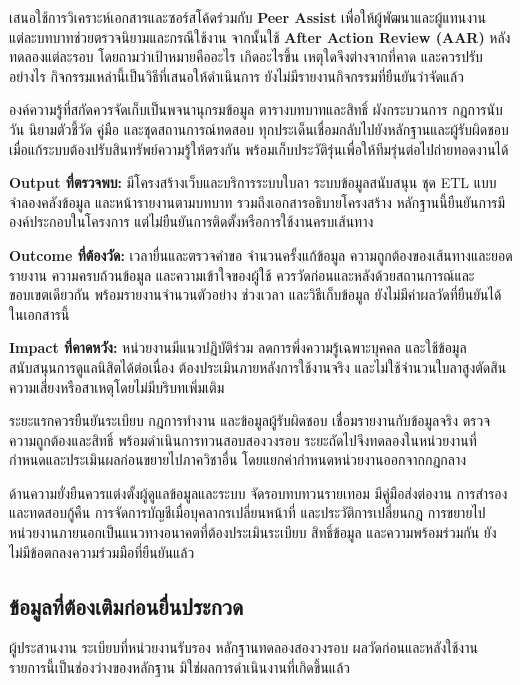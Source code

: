 เสนอใช้การวิเคราะห์เอกสารและซอร์สโค้ดร่วมกับ \textbf{Peer Assist} เพื่อให้ผู้พัฒนาและผู้แทนงานแต่ละบทบาทช่วยตรวจนิยามและกรณีใช้งาน จากนั้นใช้ \textbf{After Action Review (AAR)} หลังทดลองแต่ละรอบ โดยถามว่าเป้าหมายคืออะไร เกิดอะไรขึ้น เหตุใดจึงต่างจากที่คาด และควรปรับอย่างไร กิจกรรมเหล่านี้เป็นวิธีที่เสนอให้ดำเนินการ ยังไม่มีรายงานกิจกรรมที่ยืนยันว่าจัดแล้ว

องค์ความรู้ที่สกัดควรจัดเก็บเป็นพจนานุกรมข้อมูล ตารางบทบาทและสิทธิ์ ผังกระบวนการ กฎการนับวัน นิยามตัวชี้วัด คู่มือ และชุดสถานการณ์ทดสอบ ทุกประเด็นเชื่อมกลับไปยังหลักฐานและผู้รับผิดชอบ เมื่อแก้ระบบต้องปรับสินทรัพย์ความรู้ให้ตรงกัน พร้อมเก็บประวัติรุ่นเพื่อให้ทีมรุ่นต่อไปถ่ายทอดงานได้

\textbf{Output ที่ตรวจพบ:} มีโครงสร้างเว็บและบริการระบบใบลา ระบบข้อมูลสนับสนุน ชุด ETL แบบจำลองคลังข้อมูล และหน้ารายงานตามบทบาท รวมถึงเอกสารอธิบายโครงสร้าง หลักฐานนี้ยืนยันการมีองค์ประกอบในโครงการ แต่ไม่ยืนยันการติดตั้งหรือการใช้งานครบเส้นทาง

\textbf{Outcome ที่ต้องวัด:} เวลายื่นและตรวจคำขอ จำนวนครั้งแก้ข้อมูล ความถูกต้องของเส้นทางและยอดรายงาน ความครบถ้วนข้อมูล และความเข้าใจของผู้ใช้ ควรวัดก่อนและหลังด้วยสถานการณ์และขอบเขตเดียวกัน พร้อมรายงานจำนวนตัวอย่าง ช่วงเวลา และวิธีเก็บข้อมูล ยังไม่มีค่าผลวัดที่ยืนยันได้ในเอกสารนี้

\textbf{Impact ที่คาดหวัง:} หน่วยงานมีแนวปฏิบัติร่วม ลดการพึ่งความรู้เฉพาะบุคคล และใช้ข้อมูลสนับสนุนการดูแลนิสิตได้ต่อเนื่อง ต้องประเมินภายหลังการใช้งานจริง และไม่ใช้จำนวนใบลาสูงตัดสินความเสี่ยงหรือสาเหตุโดยไม่มีบริบทเพิ่มเติม

ระยะแรกควรยืนยันระเบียบ กฎการทำงาน และข้อมูลผู้รับผิดชอบ เชื่อมรายงานกับข้อมูลจริง ตรวจความถูกต้องและสิทธิ์ พร้อมดำเนินการทวนสอบสองวงรอบ ระยะถัดไปจึงทดลองในหน่วยงานที่กำหนดและประเมินผลก่อนขยายไปภาควิชาอื่น โดยแยกค่ากำหนดหน่วยงานออกจากกฎกลาง

ด้านความยั่งยืนควรแต่งตั้งผู้ดูแลข้อมูลและระบบ จัดรอบทบทวนรายเทอม มีคู่มือส่งต่องาน การสำรองและทดสอบกู้คืน การจัดการบัญชีเมื่อบุคลากรเปลี่ยนหน้าที่ และประวัติการเปลี่ยนกฎ การขยายไปหน่วยงานภายนอกเป็นแนวทางอนาคตที่ต้องประเมินระเบียบ สิทธิ์ข้อมูล และความพร้อมร่วมกัน ยังไม่มีข้อตกลงความร่วมมือที่ยืนยันแล้ว

\subsection*{ข้อมูลที่ต้องเติมก่อนยื่นประกวด}
ผู้ประสานงาน ระเบียบที่หน่วยงานรับรอง หลักฐานทดลองสองวงรอบ ผลวัดก่อนและหลังใช้งาน รายการนี้เป็นช่องว่างของหลักฐาน มิใช่ผลการดำเนินงานที่เกิดขึ้นแล้ว
